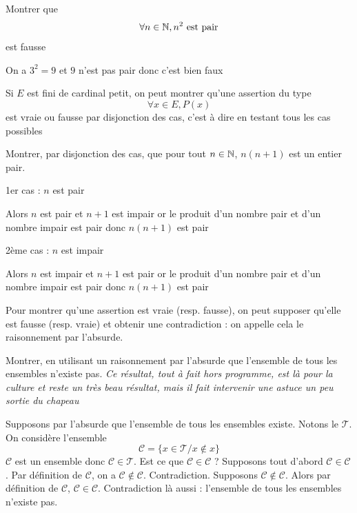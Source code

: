 \begin{exemple}
Montrer que 
$$\forall n \in \mathbb{N}, n^2 \text{ est pair}$$
est fausse\newline

On a $3^2 = 9$ et $9$ n'est pas pair donc c'est bien faux
\end{exemple}
Si $E$ est fini de cardinal petit, on peut montrer qu'une assertion du type 
$$\forall x \in E , P(x)$$
est vraie ou fausse par disjonction des cas, c'est à dire en testant tous les cas possibles \newline


\begin{exemple}
Montrer, par disjonction des cas, que pour tout $n \in \mathbb{N}$, $n(n+1)$ est un entier pair.\newline

1er cas : $n$ est pair\newline

Alors $n$ est pair et $n+1$ est impair or le produit d'un nombre pair et d'un nombre impair est pair donc $n(n+1)$ est pair\newline

2ème cas : $n$ est impair\newline

Alors $n$ est impair et $n+1$ est pair or le produit d'un nombre pair et d'un nombre impair est pair donc $n(n+1)$ est pair
\end{exemple} 

Pour montrer qu'une assertion est vraie (resp. fausse), on peut supposer qu'elle est fausse (resp. vraie) et obtenir une contradiction : on appelle cela le raisonnement par l'absurde.

\begin{exemple}
Montrer, en utilisant un raisonnement par l'absurde que l'ensemble de tous les ensembles n'existe pas. \emph{Ce résultat, tout à fait hors programme, est là pour la culture et reste un très beau résultat, mais il fait intervenir une astuce un peu sortie du chapeau}

Supposons par l'absurde que l'ensemble de tous les ensembles existe. Notons le $\mathcal{T}$. On considère l'ensemble $$\mathcal{C} = \{x \in \mathcal{T} / x \notin x\}$$
$\mathcal{C}$ est un ensemble donc $\mathcal{C} \in \mathcal{T}$. Est ce que $\mathcal{C} \in \mathcal{C}$ ? Supposons tout d'abord $\mathcal{C} \in \mathcal{C}$ . Par définition de $\mathcal{C}$, on a $\mathcal{C} \notin \mathcal{C}$. Contradiction. Supposons $\mathcal{C} \notin \mathcal{C}$. Alors par définition de $\mathcal{C}$, $\mathcal{C} \in \mathcal{C}$. Contradiction là aussi : l'ensemble de tous les ensembles n'existe pas.
\end{exemple}

